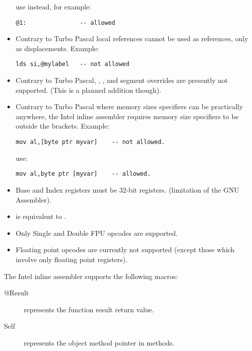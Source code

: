 \begin{itemize}
\begin{verbatim}
\end{verbatim}
  use instead, for example:
\begin{verbatim}
@1:               -- allowed
\end{verbatim}
\item  Contrary to Turbo Pascal local references cannot be used as references,
   only as displacements. Example:
\begin{verbatim}
lds si,@mylabel   -- not allowed
\end{verbatim}
\item  Contrary to Turbo Pascal, , ,  and
 segment overrides are presently not supported.
   (This is a planned addition though).
\item  Contrary to Turbo Pascal where memory sizes specifiers can
   be practically anywhere, the \fpc Intel inline assembler requires
   memory size specifiers to be outside the brackets. Example:
\begin{verbatim}
mov al,[byte ptr myvar]    -- not allowed.
\end{verbatim}
 use:
\begin{verbatim}
mov al,byte ptr [myvar]    -- allowed.
\end{verbatim}
\item  Base and Index registers must be 32-bit registers.
     (limitation of the GNU Assembler).
\item  {} is equivalent to .
\item  Only Single and Double FPU opcodes are supported.
\item  Floating point opcodes are currently not supported
   (except those which involve only floating point registers).
\end{itemize}

The Intel inline assembler supports the following macros:
\begin{description}
\item [@Result] represents the function result return value.
\item [Self] represents the object method pointer in methods.
\end{description}

